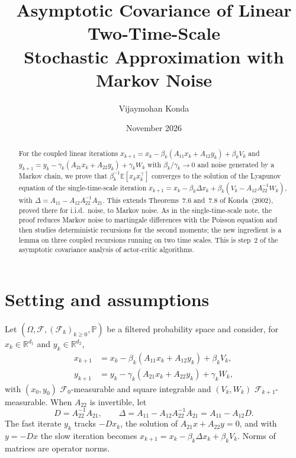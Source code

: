 \documentclass[11pt]{article}
\title{Asymptotic Covariance of Linear Two-Time-Scale\\ Stochastic Approximation with Markov Noise}
\author{Vijaymohan Konda}
\date{November 2026}
\theoremstyle{definition}
\theoremstyle{remark}
\newcommand{\R}{\mathbb{R}}
\newcommand{\E}{\mathbb{E}}
\newcommand{\F}{\mathcal{F}}
\begin{document}
\maketitle

\begin{abstract}
For the coupled linear iterations
$x_{k+1} = x_k - \beta_k(A_{11}x_k + A_{12}y_k) + \beta_kV_k$ and
$y_{k+1} = y_k - \gamma_k(A_{21}x_k + A_{22}y_k) + \gamma_kW_k$ with $\beta_k/\gamma_k \to 0$
and noise generated by a Markov chain, we prove that $\beta_k^{-1}\E[x_kx_k^\top]$ converges to
the solution of the Lyapunov equation of the single-time-scale iteration
$x_{k+1} = x_k - \beta_k\Delta x_k + \beta_k(V_k - A_{12}A_{22}^{-1}W_k)$, with
$\Delta = A_{11} - A_{12}A_{22}^{-1}A_{21}$. This extends Theorems~7.6 and~7.8 of
Konda~(2002), proved there for i.i.d.\ noise, to Markov noise. As in the single-time-scale
note, the proof reduces Markov noise to martingale differences with the Poisson equation and
then studies deterministic recursions for the second moments; the new ingredient is a lemma
on three coupled recursions running on two time scales. This is step~2 of the asymptotic
covariance analysis of actor-critic algorithms.
\end{abstract}

\tableofcontents

\section{Setting and assumptions}

Let $(\Omega, \F, (\F_k)_{k\ge0}, \mathbb P)$ be a filtered probability space and consider,
for $x_k \in \R^{d_1}$ and $y_k \in \R^{d_2}$,
\begin{equation}\label{eq:iter}
\begin{aligned}
  x_{k+1} &= x_k - \beta_k(A_{11}x_k + A_{12}y_k) + \beta_kV_k,\\
  y_{k+1} &= y_k - \gamma_k(A_{21}x_k + A_{22}y_k) + \gamma_kW_k,
\end{aligned}
\end{equation}
with $(x_0, y_0)$ $\F_0$-measurable and square integrable and $(V_k, W_k)$
$\F_{k+1}$-measurable. When $A_{22}$ is invertible, let
\[
  D = A_{22}^{-1}A_{21},\qquad \Delta = A_{11} - A_{12}A_{22}^{-1}A_{21} = A_{11} - A_{12}D .
\]
The fast iterate $y_k$ tracks $-Dx_k$, the solution of $A_{21}x + A_{22}y = 0$, and with
$y = -Dx$ the slow iteration becomes $x_{k+1} = x_k - \beta_k\Delta x_k + \beta_kV_k$.
Norms of matrices are operator norms.
\end{document}

